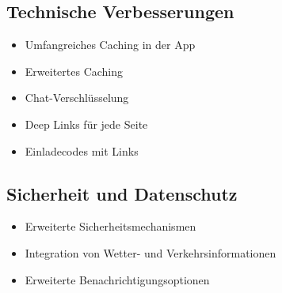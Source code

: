 \subsection{Technische Verbesserungen}
\begin{itemize}
  \item Umfangreiches Caching in der App
  \item Erweitertes Caching
  \item Chat-Verschlüsselung
  \item Deep Links für jede Seite
  \item Einladecodes mit Links
\end{itemize}

\subsection{Sicherheit und Datenschutz}
\begin{itemize}
  \item Erweiterte Sicherheitsmechanismen
  \item Integration von Wetter- und Verkehrsinformationen
  \item Erweiterte Benachrichtigungsoptionen
\end{itemize}

